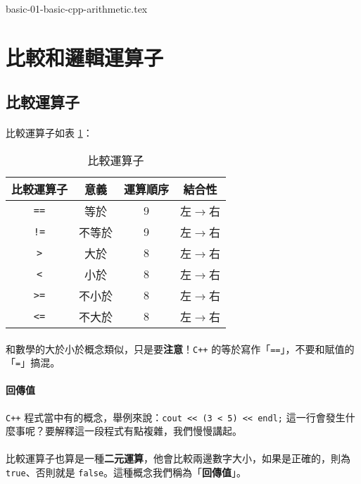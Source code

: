 \documentclass[12pt,a4paper,oneside]{report}
\begin{document}
\begin{CJK}{UTF8}{bkai}
\label{basic:cpp:problem:arithmetic}
{basic-01-basic-cpp-arithmetic.tex}

\section{比較和邏輯運算子}
\subsection{比較運算子}

\paragraph{}比較運算子如表 \ref{basic:cpp:table:operator:comparison}：
\begin{table}[h!]
\centering
\begin{tabular}{|c|c|c|c|}
\hline
比較運算子 & 意義 & 運算順序 & 結合性\\
\hline
\hline
\lstinline!==! & 等於 & 9 & 左$\rightarrow$右\\
\hline
\lstinline"!=" & 不等於 & 9 & 左$\rightarrow$右\\
\hline
\lstinline!>!  & 大於 & 8 & 左$\rightarrow$右\\
\hline
\lstinline!<!  & 小於 & 8 & 左$\rightarrow$右\\
\hline
\lstinline!>=! & 不小於 & 8 & 左$\rightarrow$右\\
\hline
\lstinline!<=! & 不大於 & 8 & 左$\rightarrow$右\\
\hline
\end{tabular}
\caption{比較運算子}
\label{basic:cpp:table:operator:comparison}
\end{table}

\paragraph{}和數學的大於小於概念類似，只是要\textbf{注意}！\texttt{C++} 的等於寫作「\lstinline!==!」，不要和賦值的「\lstinline!=!」搞混。
\paragraph{回傳值} \texttt{C++} 程式當中有的概念，舉例來說：\lstinline!cout << (3 < 5) << endl;! 這一行會發生什麼事呢？要解釋這一段程式有點複雜，我們慢慢講起。
\paragraph{}比較運算子也算是一種\textbf{二元運算}，他會比較兩邊數字大小，如果是正確的，則為 \lstinline!true!、否則就是 \lstinline!false!。這種概念我們稱為「\textbf{回傳值}」。

\end{CJK}
\end{document}
